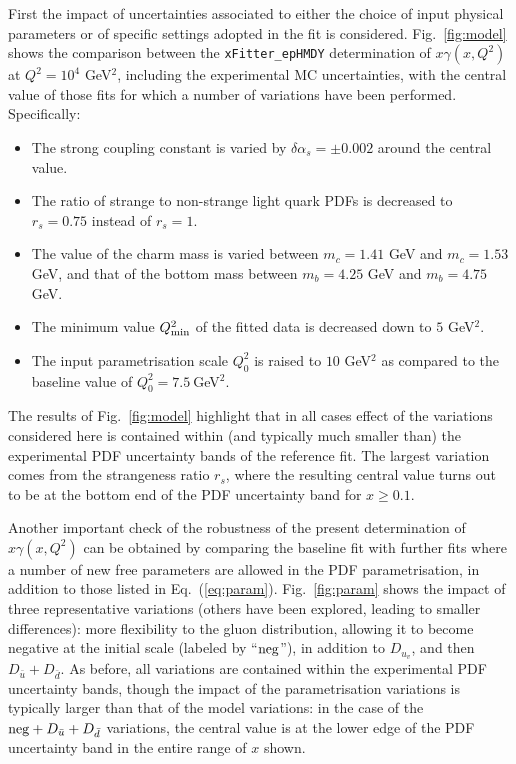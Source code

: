 First the impact of uncertainties associated to either
the choice of input physical parameters or of specific settings
adopted in the fit is considered.
%
Fig.~\ref{fig:model} shows the comparison between the
{\tt xFitter\_epHMDY} 
determination of $x\gamma(x,Q^2)$ at $Q^2=10^4$ GeV$^2$, including the experimental MC
uncertainties, with the central
value of those fits for which a number of variations have been
performed.
%
Specifically:
\begin{itemize}
\item The strong coupling constant is varied by $\delta \alpha_s=\pm 0.002$ around the central value.
\item The ratio of strange to non-strange light quark PDFs is decreased to $r_s=0.75$ instead of $r_s=1$.
\item The value of the charm mass is varied between $m_c=1.41$ GeV and $m_c=1.53$ GeV,
  and that of the bottom mass between $m_b=4.25$ GeV and $m_b=4.75$ GeV.
\item The minimum value $Q_{\rm min}^2$ of the fitted data is decreased down to $5$ GeV$^2$.
\item The input parametrisation scale $Q_0^2$ is raised to $10$ GeV$^2$ as compared
  to the baseline value of $Q_0^2=7.5~$GeV$^2$.
\end{itemize}
The results of Fig.~\ref{fig:model} highlight that in all cases effect
of the variations considered here is contained within (and typically much smaller than) 
the experimental PDF uncertainty bands of the reference fit.
%
The largest variation comes from the strangeness ratio $r_s$, where the resulting
central value turns out to be at the bottom end of the PDF uncertainty band for $x\ge 0.1$.

Another important check of the robustness of the present determination of
$x\gamma(x, Q^2)$ can be obtained by comparing the baseline fit with further
fits where a number of new free parameters are allowed in the PDF
parametrisation, in addition to those listed in Eq.~(\ref{eq:param}).
%
Fig.~\ref{fig:param} shows the impact of three representative
variations (others have been explored, leading to smaller
differences): more flexibility to the gluon distribution, allowing it
to become negative at the initial scale (labeled by ``${\rm neg}$''), in addition to $D_{u_v}$,
and then $D_{\bar{u}}+D_{\bar{d}}$.
%
As before, all variations are contained within the experimental PDF uncertainty
bands, though the impact of the parametrisation variations is typically larger
than that of the model variations: in the case of the
${\rm neg}+D_{\bar{u}}+D_{\bar{d}}$ variations, the central value is
at the lower edge of the PDF uncertainty band in the entire range
of $x$ shown.
%


